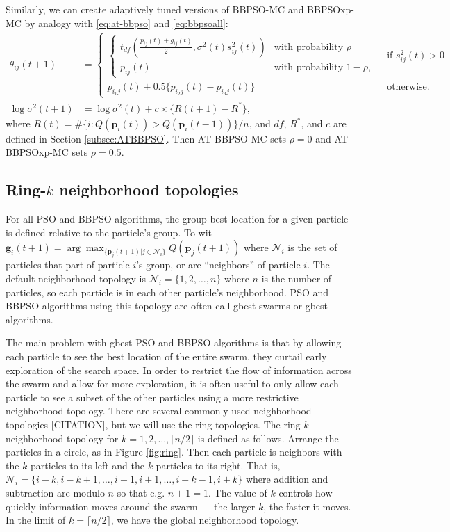 \documentclass[12pt]{article}
\begin{document}
Similarly, we can create adaptively tuned versions of BBPSO-MC and BBPSOxp-MC by analogy with \eqref{eq:at-bbpso} and \eqref{eq:bbpsoall}:
\begin{align*}%
\theta_{ij}(t+1) &= 
  \begin{cases} 
    \begin{cases} t_{df}\left(\frac{p_{ij}(t) + g_{ij}(t)}{2}, \sigma^2(t)s^2_{ij}(t)\right) & \mbox{with probability } \rho\\
      p_{ij}(t) & \mbox{with probability } 1 - \rho,
    \end{cases}
    & \mbox{ if } s^2_{ij}(t) > 0\\
    p_{i_1j}(t) + 0.5\{p_{i_2j}(t) - p_{i_3j}(t)\} & \mbox{ otherwise.}
  \end{cases}\\
\log\sigma^2(t+1) &= \log\sigma^2(t) + c\times\{R(t+1) - R^*\},
\end{align*}
where $R(t)=\#\{i:Q(\bm{p}_i(t))> Q(\bm{p}_i(t-1))\}/n$, and $df$, $R^*$, and $c$ are defined in Section \ref{subsec:ATBBPSO}. Then AT-BBPSO-MC sets $\rho=0$ and AT-BBPSOxp-MC sets $\rho=0.5$.

\subsection{Ring-$k$ neighborhood topologies}\label{subapp:ring}
For all PSO and BBPSO algorithms, the group best location for a given particle is defined relative to the particle's group. To wit $\bm{g}_i(t+1) = \arg\max_{\{\bm{p}_j(t+1)|j\in\mathcal{N}_i\}}Q(\bm{p}_j(t+1))$ where $\mathcal{N}_i$ is the set of particles that part of particle $i$'s group, or are ``neighbors'' of particle $i$. The default neighborhood topology is $\mathcal{N}_i = \{1, 2, \dots, n\}$ where $n$ is the number of particles, so each particle is in each other particle's neighborhood. PSO and BBPSO algorithms using this topology are often call gbest swarms or gbest algorithms. 

The main problem with gbest PSO and BBPSO algorithms is that by allowing each particle to see the best location of the entire swarm, they curtail early exploration of the search space. In order to restrict the flow of information across the swarm and allow for more exploration, it is often useful to only allow each particle to see a subset of the other particles using a more restrictive neighborhood topology. There are several commonly used neighborhood topologies [CITATION], but we will use the ring topologies. The ring-$k$ neighborhood topology for $k=1,2,\dots,\lceil n/2\rceil$ is defined as follows. Arrange the particles in a circle, as in Figure \ref{fig:ring}. Then each particle is neighbors with the $k$ particles to its left and the $k$ particles to its right. That is, $\mathcal{N}_i = \{i-k, i-k+1, \dots, i-1, i+1, \dots, i+k-1, i+k\}$ where addition and subtraction are modulo $n$ so that e.g. $n + 1 = 1$. The value of $k$ controls how quickly information moves around the swarm --- the larger $k$, the faster it moves. In the limit of $k=\lceil n/2 \rceil$, we have the global neighborhood topology.
\end{document}
